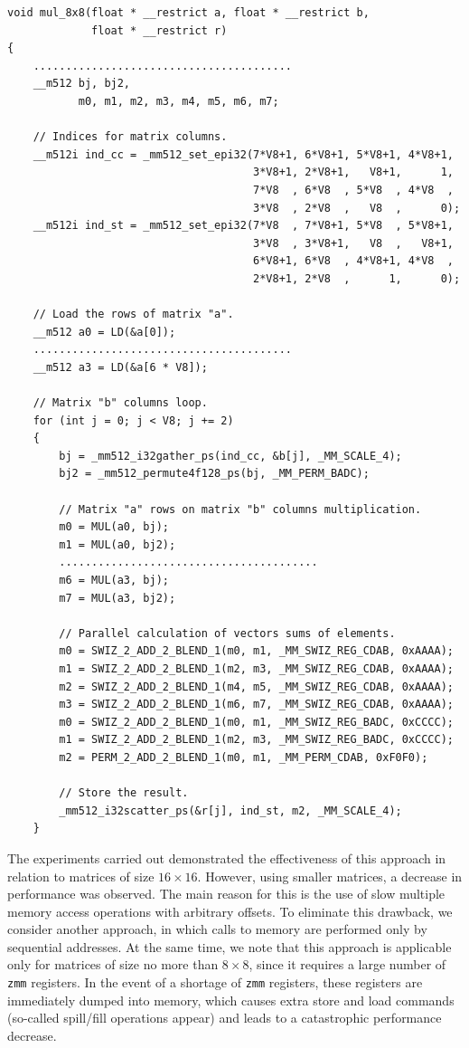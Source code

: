 \documentclass[
11pt,%
tightenlines,%
twoside,%
onecolumn,%
nofloats,%
nobibnotes,%
nofootinbib,%
superscriptaddress,%
noshowpacs,%
centertags]%
{revtex4}
\begin{document}
\begin{lstlisting}
void mul_8x8(float * __restrict a, float * __restrict b,
             float * __restrict r)
{
    ........................................
    __m512 bj, bj2,
           m0, m1, m2, m3, m4, m5, m6, m7;

    // Indices for matrix columns.
    __m512i ind_cc = _mm512_set_epi32(7*V8+1, 6*V8+1, 5*V8+1, 4*V8+1,
                                      3*V8+1, 2*V8+1,   V8+1,      1,
                                      7*V8  , 6*V8  , 5*V8  , 4*V8  ,
                                      3*V8  , 2*V8  ,   V8  ,      0);
    __m512i ind_st = _mm512_set_epi32(7*V8  , 7*V8+1, 5*V8  , 5*V8+1,
                                      3*V8  , 3*V8+1,   V8  ,   V8+1,
                                      6*V8+1, 6*V8  , 4*V8+1, 4*V8  ,
                                      2*V8+1, 2*V8  ,      1,      0);

    // Load the rows of matrix "a".
    __m512 a0 = LD(&a[0]);
    ........................................
    __m512 a3 = LD(&a[6 * V8]);

    // Matrix "b" columns loop.
    for (int j = 0; j < V8; j += 2)
    {
        bj = _mm512_i32gather_ps(ind_cc, &b[j], _MM_SCALE_4);
        bj2 = _mm512_permute4f128_ps(bj, _MM_PERM_BADC);

        // Matrix "a" rows on matrix "b" columns multiplication.
        m0 = MUL(a0, bj);
        m1 = MUL(a0, bj2);
        ........................................
        m6 = MUL(a3, bj);
        m7 = MUL(a3, bj2);

        // Parallel calculation of vectors sums of elements.
        m0 = SWIZ_2_ADD_2_BLEND_1(m0, m1, _MM_SWIZ_REG_CDAB, 0xAAAA);
        m1 = SWIZ_2_ADD_2_BLEND_1(m2, m3, _MM_SWIZ_REG_CDAB, 0xAAAA);
        m2 = SWIZ_2_ADD_2_BLEND_1(m4, m5, _MM_SWIZ_REG_CDAB, 0xAAAA);
        m3 = SWIZ_2_ADD_2_BLEND_1(m6, m7, _MM_SWIZ_REG_CDAB, 0xAAAA);
        m0 = SWIZ_2_ADD_2_BLEND_1(m0, m1, _MM_SWIZ_REG_BADC, 0xCCCC);
        m1 = SWIZ_2_ADD_2_BLEND_1(m2, m3, _MM_SWIZ_REG_BADC, 0xCCCC);
        m2 = PERM_2_ADD_2_BLEND_1(m0, m1, _MM_PERM_CDAB, 0xF0F0);

        // Store the result.
        _mm512_i32scatter_ps(&r[j], ind_st, m2, _MM_SCALE_4);
    }
\end{lstlisting}

The experiments carried out demonstrated the effectiveness of this approach in relation to matrices of size $16 \times 16$.
However, using smaller matrices, a decrease in performance was observed.
The main reason for this is the use of slow multiple memory access operations with arbitrary offsets.
To eliminate this drawback, we consider another approach, in which calls to memory are performed only by sequential addresses.
At the same time, we note that this approach is applicable only for matrices of size no more than $8 \times 8$, since it requires a large number of \texttt{zmm} registers.
In the event of a shortage of \texttt{zmm} registers, these registers are immediately dumped into memory, which causes extra store and load commands (so-called spill/fill operations appear) and leads to a catastrophic performance decrease.
\end{document}
